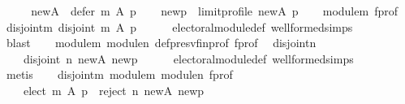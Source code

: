 \begin{isabellebody}
%
\isadelimproof
%
\endisadelimproof
%
\isatagproof
{}\isamarkupfalse%
\ {\isacharminus}{\kern0pt}\isanewline
\ \ \isamarkupfalse%
\ {\isacharquery}{\kern0pt}new{\isacharunderscore}{\kern0pt}A\ {\isacharequal}{\kern0pt}\ {\isachardoublequoteopen}defer\ m\ A\ p{\isachardoublequoteclose}\isanewline
\ \ \isamarkupfalse%
\ {\isacharquery}{\kern0pt}new{\isacharunderscore}{\kern0pt}p\ {\isacharequal}{\kern0pt}\ {\isachardoublequoteopen}limit{\isacharunderscore}{\kern0pt}profile\ {\isacharquery}{\kern0pt}new{\isacharunderscore}{\kern0pt}A\ p{\isachardoublequoteclose}\isanewline
\ \ \isamarkupfalse%
\ module{\isacharunderscore}{\kern0pt}m\ f{\isacharunderscore}{\kern0pt}prof\ \isamarkupfalse%
\ disjoint{\isacharunderscore}{\kern0pt}m{\isacharcolon}{\kern0pt}\ {\isachardoublequoteopen}disjoint{}\ {\isacharparenleft}{\kern0pt}m\ A\ p{\isacharparenright}{\kern0pt}{\isachardoublequoteclose}\isanewline
\ \ \ \ \isamarkupfalse%
\ electoral{\isacharunderscore}{\kern0pt}module{\isacharunderscore}{\kern0pt}def\ well{\isacharunderscore}{\kern0pt}formed{\isachardot}{\kern0pt}simps\isanewline
\ \ \ \ \isamarkupfalse%
\ blast\isanewline
\ \ \isamarkupfalse%
\ module{\isacharunderscore}{\kern0pt}m\ module{\isacharunderscore}{\kern0pt}n\ def{\isacharunderscore}{\kern0pt}presv{\isacharunderscore}{\kern0pt}fin{\isacharunderscore}{\kern0pt}prof\ f{\isacharunderscore}{\kern0pt}prof\ \isamarkupfalse%
\ disjoint{\isacharunderscore}{\kern0pt}n{\isacharcolon}{\kern0pt}\isanewline
\ \ \ \ {\isachardoublequoteopen}{\isacharparenleft}{\kern0pt}disjoint{}\ {\isacharparenleft}{\kern0pt}n\ {\isacharquery}{\kern0pt}new{\isacharunderscore}{\kern0pt}A\ {\isacharquery}{\kern0pt}new{\isacharunderscore}{\kern0pt}p{\isacharparenright}{\kern0pt}{\isacharparenright}{\kern0pt}{\isachardoublequoteclose}\isanewline
\ \ \ \ \isamarkupfalse%
\ electoral{\isacharunderscore}{\kern0pt}module{\isacharunderscore}{\kern0pt}def\ well{\isacharunderscore}{\kern0pt}formed{\isachardot}{\kern0pt}simps\isanewline
\ \ \ \ \isamarkupfalse%
\ metis\isanewline
\ \ \isamarkupfalse%
\ disjoint{\isacharunderscore}{\kern0pt}m\ module{\isacharunderscore}{\kern0pt}m\ module{\isacharunderscore}{\kern0pt}n\ f{\isacharunderscore}{\kern0pt}prof\ \isamarkupfalse%
\ {}{\isacharcolon}{\kern0pt}\isanewline
\ \ \ \ {\isachardoublequoteopen}{\isacharparenleft}{\kern0pt}elect\ m\ A\ p\ {\isasyminter}\ reject\ n\ {\isacharquery}{\kern0pt}new{\isacharunderscore}{\kern0pt}A\ {\isacharquery}{\kern0pt}new{\isacharunderscore}{\kern0pt}p{\isacharparenright}{\kern0pt}\ {\isacharequal}{\kern0pt}\ {\isacharbraceleft}{\kern0pt}{\isacharbraceright}{\kern0pt}{\isachardoublequoteclose}\isanewline

\end{isabellebody}
